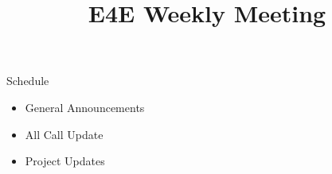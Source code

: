 \documentclass[aspectratio=169]{beamer}
\title{E4E Weekly Meeting}
\institute{UC San Diego}
\begin{document}
\maketitle
\begin{frame}{Schedule}
    \begin{itemize}
        \item General Announcements
        \item All Call Update
        \begin{enumerate}
            
        \end{enumerate}
        \item Project Updates
        \begin{enumerate}
            
        \end{enumerate}
    \end{itemize}
\end{frame}


\end{document}
